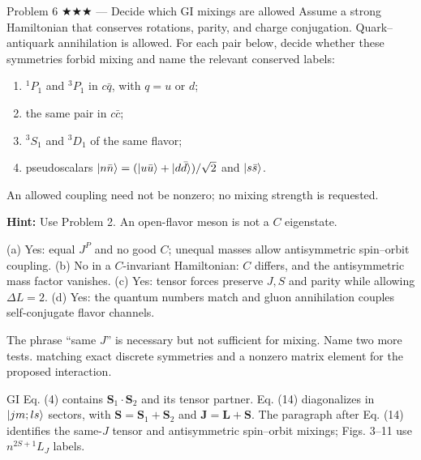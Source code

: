 \documentclass[11pt]{article}
\begin{document}
\begin{problem}{Problem 6 ★★★ — Decide which GI mixings are allowed}
Assume a strong Hamiltonian that conserves rotations, parity, and charge
conjugation. Quark--antiquark annihilation is allowed.
For each pair below, decide whether these symmetries forbid mixing and name
the relevant conserved labels:
\begin{enumerate}[label=(\alph*)]
\item $^1P_1$ and $^3P_1$ in $c\bar q$, with $q=u$ or $d$;
\item the same pair in $c\bar c$;
\item $^3S_1$ and $^3D_1$ of the same flavor;
\item pseudoscalars $\lvert n\bar n\rangle=(\lvert u\bar u\rangle+\lvert d\bar d\rangle)/\sqrt2$
and $\lvert s\bar s\rangle$.
\end{enumerate}
An allowed coupling need not be nonzero; no mixing strength is requested.

\textbf{Hint:} Use Problem 2. An open-flavor meson is not a $C$ eigenstate.
\end{problem}
\begin{solution}
(a) Yes: equal $J^P$ and no good $C$; unequal masses allow antisymmetric
spin--orbit coupling. (b) No in a $C$-invariant Hamiltonian: $C$ differs, and
the antisymmetric mass factor vanishes. (c) Yes: tensor forces preserve
$J,S$ and parity while allowing $\Delta L=2$. (d) Yes: the quantum numbers
match and gluon annihilation couples self-conjugate flavor channels.
\end{solution}
\begin{quiz}
The phrase ``same $J$'' is necessary but not sufficient for mixing. Name two
more tests. \answer matching exact discrete symmetries and a nonzero matrix
element for the proposed interaction.
\end{quiz}

\begin{paperbridge}
\small
GI Eq. (4) contains $\bm S_1\cdot\bm S_2$ and its tensor partner. Eq. (14)
diagonalizes in $\lvert jm;ls\rangle$ sectors, with $\bm S=\bm S_1+\bm S_2$ and
$\bm J=\bm L+\bm S$. The paragraph after Eq. (14) identifies the same-$J$
tensor and antisymmetric spin--orbit mixings; Figs. 3--11 use
$n^{2S+1}L_J$ labels.
\end{paperbridge}
\end{document}
